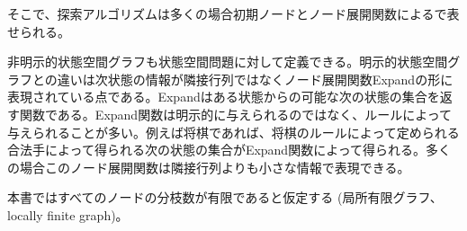 そこで、探索アルゴリズムは多くの場合初期ノードとノード展開関数によるで表せられる。


非明示的状態空間グラフも状態空間問題に対して定義できる。明示的状態空間グラフとの違いは次状態の情報が隣接行列ではなくノード展開関数Expandの形に表現されている点である。Expandはある状態からの可能な次の状態の集合を返す関数である。Expand関数は明示的に与えられるのではなく、ルールによって与えられることが多い。例えば将棋であれば、将棋のルールによって定められる合法手によって得られる次の状態の集合がExpand関数によって得られる。多くの場合このノード展開関数は隣接行列よりも小さな情報で表現できる。

本書ではすべてのノードの分枝数が有限であると仮定する (局所有限グラフ、locally finite graph)。%



